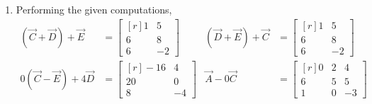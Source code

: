 \begin{enumerate}
    \item Performing the given computations,
          \begin{align}
              (\vec{C} + \vec{D}) + \vec{E}   & = \begin{bmatrix*}[r]
                                                      1 & 5  \\
                                                      6 & 8  \\
                                                      6 & -2
                                                  \end{bmatrix*} &
              (\vec{D} + \vec{E}) + \vec{C}   & = \begin{bmatrix*}[r]
                                                      1 & 5  \\
                                                      6 & 8  \\
                                                      6 & -2
                                                  \end{bmatrix*} \\
              0(\vec{C} - \vec{E}) + 4\vec{D} & = \begin{bmatrix*}[r]
                                                      -16 & 4  \\
                                                      20  & 0  \\
                                                      8   & -4
                                                  \end{bmatrix*} &
              \vec{A} - 0\vec{C}              & = \begin{bmatrix*}[r]
                                                      0 & 2 & 4  \\
                                                      6 & 5 & 5  \\
                                                      1 & 0 & -3
                                                  \end{bmatrix*}
          \end{align}


\end{enumerate}
